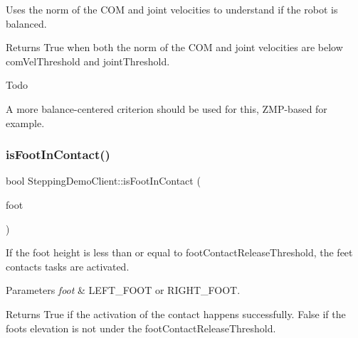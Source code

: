 Uses the norm of the C\+OM and joint velocities to understand if the robot is balanced.

\begin{DoxyReturn}{Returns}
True when both the norm of the C\+OM and joint velocities are below com\+Vel\+Threshold and joint\+Threshold. 
\end{DoxyReturn}
\begin{DoxyRefDesc}{Todo}
\item[\hyperlink{todo__todo000002}{Todo}]A more balance-\/centered criterion should be used for this, Z\+M\+P-\/based for example. \end{DoxyRefDesc}
\hypertarget{classSteppingDemoClient_aeeaa9fac47e3e5a141647b07fa2feaa3}{}\label{classSteppingDemoClient_aeeaa9fac47e3e5a141647b07fa2feaa3} 
\subsubsection{\texorpdfstring{is\+Foot\+In\+Contact()}{isFootInContact()}}
{\footnotesize\ttfamily bool Stepping\+Demo\+Client\+::is\+Foot\+In\+Contact (\begin{DoxyParamCaption}\item[{\hyperlink{SteppingDemoClient_8h_ab0673d7f17cdd57b8fa124abb330287f}{F\+O\+O\+T\+\_\+\+C\+O\+N\+T\+A\+C\+TS}}]{foot }\end{DoxyParamCaption})\hspace{0.3cm}{\ttfamily [private]}}

If the foot height is less than or equal to foot\+Contact\+Release\+Threshold, the feet contacts tasks are activated.


\begin{DoxyParams}{Parameters}
{\em foot} & L\+E\+F\+T\+\_\+\+F\+O\+OT or R\+I\+G\+H\+T\+\_\+\+F\+O\+OT.\\
\hline
\end{DoxyParams}
\begin{DoxyReturn}{Returns}
True if the activation of the contact happens successfully. False if the foot\textquotesingle{}s elevation is not under the foot\+Contact\+Release\+Threshold. 
\end{DoxyReturn}
\hypertarget{classSteppingDemoClient_a927c8615104a5fd5968ea4ece2c22926}{}\label{classSteppingDemoClient_a927c8615104a5fd5968ea4ece2c22926} 
